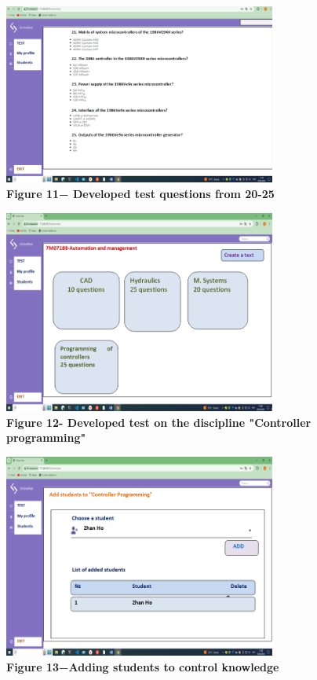 \begin{figure}[H]
	\centering
	\includegraphics[height=0.35\textwidth, width=0.8\textwidth]{assets/136}
	\caption*{\bfseries Figure 11− Developed test questions from 20-25}
\end{figure}



\begin{figure}[H]
	\centering
	\includegraphics[height=0.4\textwidth, width=0.8\textwidth]{assets/137}
	\caption*{\bfseries Figure 12- Developed test on the discipline "Controller
	programming"}
\end{figure}



\begin{figure}[H]
	\centering
	\includegraphics[height=0.4\textwidth, width=0.8\textwidth]{assets/138}
	\caption*{\bfseries Figure 13−Adding students to control knowledge}
\end{figure}

